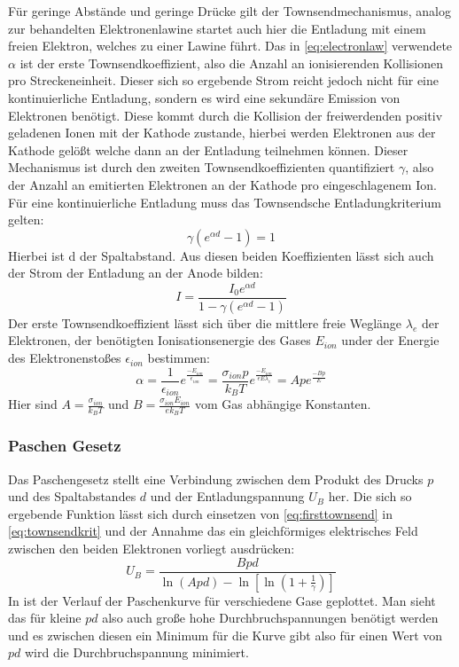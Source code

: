 Für geringe Abstände und geringe Drücke gilt der Townsendmechanismus, analog zur behandelten Elektronenlawine startet auch hier die Entladung mit einem freien Elektron, welches zu einer Lawine führt. Das in \eqref{eq:electronlaw} verwendete \(\alpha\) ist der erste Townsendkoeffizient, also die Anzahl an ionisierenden Kollisionen pro Streckeneinheit. Dieser sich so ergebende Strom reicht jedoch nicht für eine kontinuierliche Entladung, sondern es wird eine sekundäre Emission von Elektronen benötigt. Diese kommt durch die Kollision der freiwerdenden positiv geladenen Ionen mit der Kathode zustande, hierbei werden Elektronen aus der Kathode gelößt welche dann an der Entladung teilnehmen können. Dieser Mechanismus ist durch den zweiten Townsendkoeffizienten quantifiziert \(\gamma\), also der Anzahl an emitierten Elektronen an der Kathode pro eingeschlagenem Ion. Für eine kontinuierliche Entladung muss das Townsendsche Entladungkriterium gelten:
\begin{equation}
    \gamma (e^{\alpha d}-1) = 1
    \label{eq:townsendkrit}
\end{equation}
Hierbei ist d der Spaltabstand. Aus diesen beiden Koeffizienten lässt sich auch der Strom der Entladung an der Anode bilden:
\begin{equation}
    I = \frac{I_0 e^{\alpha d}}{1-\gamma (e^{\alpha d} -1)}
\end{equation}
Der erste Townsendkoeffizient lässt sich über die mittlere freie Weglänge \(\lambda_e\) der Elektronen, der benötigten Ionisationsenergie des Gases \(E_{ion}\) under der Energie des Elektronenstoßes \(\epsilon_{ion}\) bestimmen:
\begin{equation}
    \alpha = \frac{1}{\epsilon_{ion}} e^{\frac{-E_{ion}}{\epsilon_{ion}}} 
    = \frac{\sigma_{ion}p}{k_B T} e^{\frac{-E_{ion}}{eE\lambda_e}} 
    = A p e^{\frac{-Bp}{E}}
    \label{eq:firsttownsend}
\end{equation}
Hier sind \(A = \frac{\sigma_{ion}}{k_B T}\) und \(B = \frac{\sigma_{ion} E_{ion}}{ek_B T}\) vom Gas abhängige Konstanten. \cite{fu2020}


\subsubsection{Paschen Gesetz}
\label{sec:paschenlaw}
Das Paschengesetz stellt eine Verbindung zwischen dem Produkt des Drucks \(p\) und des Spaltabstandes \(d\) und der Entladungspannung \(U_B\) her. Die sich so ergebende Funktion lässt sich durch einsetzen von \eqref{eq:firsttownsend} in \eqref{eq:townsendkrit} und der Annahme das ein gleichförmiges elektrisches Feld zwischen den beiden Elektronen vorliegt ausdrücken:
\begin{equation}
    U_B = \frac{Bpd}{\ln\left( Apd \right) - \ln\left[ \ln\left(1 + \frac{1}{\gamma} \right) \right]}
    \label{eq:townsendbreak}
\end{equation}
In  ist der Verlauf der Paschenkurve für verschiedene Gase geplottet. Man sieht das für kleine \(pd\) also auch große hohe Durchbruchspannungen benötigt werden und es zwischen diesen ein Minimum für die Kurve gibt also für einen Wert von \(pd\) wird die Durchbruchspannung minimiert.

